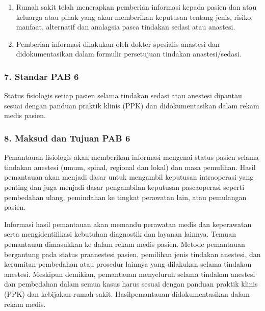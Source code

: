 \documentclass[
]{book}
\providecommand{\tightlist}{%
  \setlength{\itemsep}{0pt}\setlength{\parskip}{0pt}}
\begin{document}
\begin{enumerate}
\def\labelenumi{\alph{enumi}.}
\tightlist
\item
  Rumah sakit telah menerapkan pemberian informasi kepada pasien dan atau keluarga atau pihak yang akan memberikan keputusan tentang jenis, risiko, manfaat, alternatif dan analagsia pasca tindakan sedasi atau anastesi.
\item
  Pemberian informasi dilakukan oleh dokter spesialis anastesi dan didokumentasikan dalam formulir persetujuan tindakan anastesi/sedasi.
\end{enumerate}

\hypertarget{standar-pab-6}{%
\subsubsection*{7. Standar PAB 6}\label{standar-pab-6}}

Status fisiologis setiap pasien selama tindakan sedasi atau anestesi dipantau sesuai dengan panduan praktik klinis (PPK) dan didokumentasikan dalam rekam medis pasien.

\hypertarget{maksud-dan-tujuan-pab-6}{%
\subsubsection*{8. Maksud dan Tujuan PAB 6}\label{maksud-dan-tujuan-pab-6}}

Pemantauan fisiologis akan memberikan informasi mengenai status pasien selama tindakan anestesi (umum, spinal, regional dan lokal) dan masa pemulihan. Hasil pemantauan akan menjadi dasar untuk mengambil keputusan intraoperasi yang penting dan juga menjadi dasar pengambilan keputusan pascaoperasi seperti pembedahan ulang, pemindahan ke tingkat perawatan lain, atau pemulangan pasien.

Informasi hasil pemantauan akan memandu perawatan medis dan keperawatan serta mengidentifikasi kebutuhan diagnostik dan layanan lainnya. Temuan pemantauan dimasukkan ke dalam rekam medis pasien. Metode pemantauan bergantung pada status praanestesi pasien, pemilihan jenis tindakan anestesi, dan kerumitan pembedahan atau prosedur lainnya yang dilakukan selama tindakan anestesi. Meskipun demikian, pemantauan menyeluruh selama tindakan anestesi dan pembedahan dalam semua kasus harus sesuai dengan panduan praktik klinis (PPK) dan kebijakan rumah sakit. Hasilpemantauan didokumentasikan dalam rekam medis.
\end{document}
